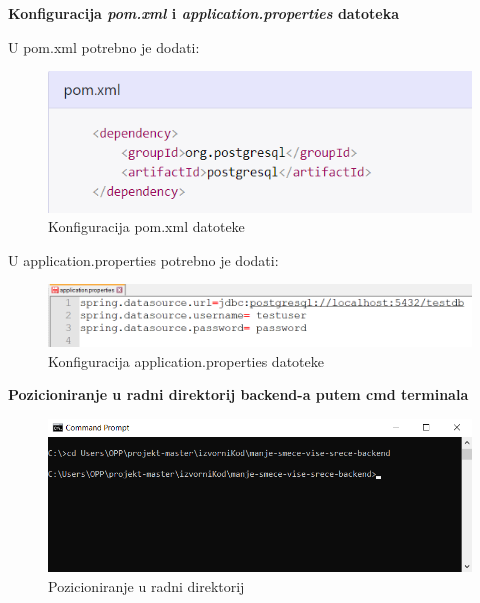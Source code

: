 \begin{packed_enum}
		            \item \textbf{Konfiguracija \textit{pom.xml} i \textit{application.properties} datoteka}
		                \begin{packed_item}
                			\item {U pom.xml potrebno je dodati:} 
                			    \begin{figure}[H]
            					\includegraphics[scale=0.7]{slike/backend/pompostgres.png}
            					\centering
            					\caption{Konfiguracija pom.xml datoteke}
            					\label{fig:pom.xml-setup}
            		            \end{figure}
                			\item {U application.properties potrebno je dodati:}
                			    \begin{figure}[H]
            					\includegraphics[scale=0.8]{slike/backend/propertiesdb.png}
            					\centering
            					\caption{Konfiguracija application.properties datoteke}
            					\label{fig:app.prop-setup}
            		            \end{figure}
    		            \end{packed_item}
    		            
    		      \item \textbf{Pozicioniranje u radni direktorij backend-a putem cmd terminala}
    		            \begin{figure}[H]
    					\includegraphics[scale=1]{slike/backend/backendposition.png}
    					\centering
    					\caption{Pozicioniranje u radni direktorij}
    					\label{fig:pozicioniranje}
    		            \end{figure}
    		        

\end{packed_enum}
